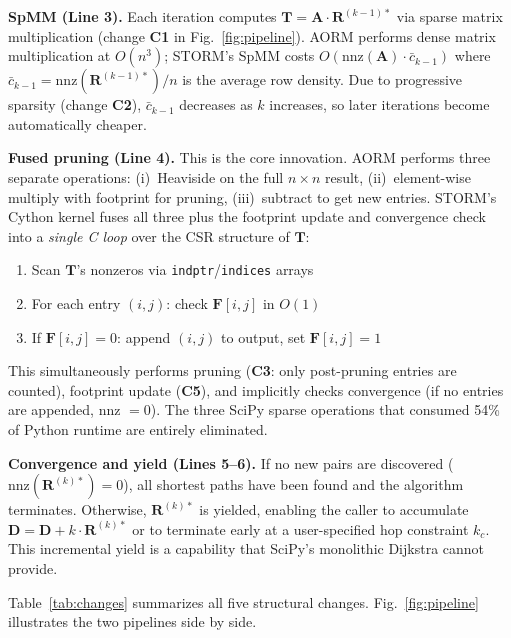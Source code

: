 \documentclass[journal]{IEEEtran}
\begin{document}
\textbf{SpMM (Line 3).} Each iteration computes $\mathbf{T} = \mathbf{A} \cdot \mathbf{R}^{(k-1)*}$ via sparse matrix multiplication (change \textbf{C1} in Fig.~\ref{fig:pipeline}). AORM performs dense matrix multiplication at $O(n^3)$; STORM's SpMM costs $O(\text{nnz}(\mathbf{A}) \cdot \bar{c}_{k-1})$ where $\bar{c}_{k-1} = \text{nnz}(\mathbf{R}^{(k-1)*})/n$ is the average row density. Due to progressive sparsity (change \textbf{C2}), $\bar{c}_{k-1}$ decreases as $k$ increases, so later iterations become automatically cheaper.

\textbf{Fused pruning (Line 4).} This is the core innovation. AORM performs three separate operations: (i)~Heaviside on the full $n \times n$ result, (ii)~element-wise multiply with footprint for pruning, (iii)~subtract to get new entries. STORM's Cython kernel fuses all three plus the footprint update and convergence check into a \emph{single C loop} over the CSR structure of $\mathbf{T}$:
\begin{enumerate}
  \item Scan $\mathbf{T}$'s nonzeros via \texttt{indptr}/\texttt{indices} arrays
  \item For each entry $(i,j)$: check $\mathbf{F}[i,j]$ in $O(1)$
  \item If $\mathbf{F}[i,j] = 0$: append $(i,j)$ to output, set $\mathbf{F}[i,j] = 1$
\end{enumerate}
This simultaneously performs pruning (\textbf{C3}: only post-pruning entries are counted), footprint update (\textbf{C5}), and implicitly checks convergence (if no entries are appended, nnz $= 0$). The three SciPy sparse operations that consumed 54\% of Python runtime are entirely eliminated.

\textbf{Convergence and yield (Lines 5--6).} If no new pairs are discovered ($\text{nnz}(\mathbf{R}^{(k)*}) = 0$), all shortest paths have been found and the algorithm terminates. Otherwise, $\mathbf{R}^{(k)*}$ is yielded, enabling the caller to accumulate $\mathbf{D} = \mathbf{D} + k \cdot \mathbf{R}^{(k)*}$ or to terminate early at a user-specified hop constraint $k_c$. This incremental yield is a capability that SciPy's monolithic Dijkstra cannot provide.


Table~\ref{tab:changes} summarizes all five structural changes. Fig.~\ref{fig:pipeline} illustrates the two pipelines side by side.
\end{document}

